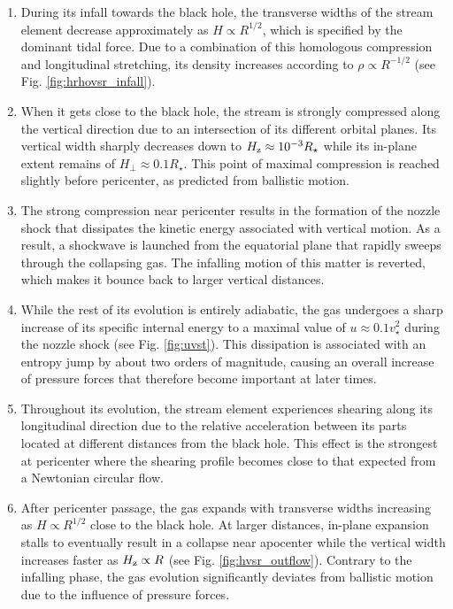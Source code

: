 \documentclass[a4paper,fleqn,usenatbib]{mnras}
\newcommand{\rstar}{R_{\star}}
\begin{document}
\begin{enumerate}

\item During its infall towards the black hole, the transverse widths of the stream element decrease approximately as $H \propto R^{1/2}$, which is specified by the dominant tidal force. Due to a combination of this homologous compression and longitudinal stretching, its density increases according to $\rho \propto R^{-1/2}$ (see Fig. \ref{fig:hrhovsr_infall}). 

\item When it gets close to the black hole, the stream is strongly compressed along the vertical direction due to an intersection of its different orbital planes. Its vertical width sharply decreases down to $H_{\rm z} \approx 10^{-3} \rstar$ while its in-plane extent remains of $H_{\perp} \approx 0.1 \rstar$. This point of maximal compression is reached slightly before pericenter, as predicted from ballistic motion. 

\item The strong compression near pericenter results in the formation of the nozzle shock that dissipates the kinetic energy associated with vertical motion. As a result, a shockwave is launched from the equatorial plane that rapidly sweeps through the collapsing gas. The infalling motion of this matter is reverted, which makes it bounce back to larger vertical distances.

\item While the rest of its evolution is entirely adiabatic, the gas undergoes a sharp increase of its specific internal energy to a maximal value of $u \approx 0.1 v^2_{\star}$ during the nozzle shock (see Fig. \ref{fig:uvst}). This dissipation is associated with an entropy jump by about two orders of magnitude, causing an overall increase of pressure forces that therefore become important at later times.

\item Throughout its evolution, the stream element experiences shearing along its longitudinal direction due to the relative acceleration between its parts located at different distances from the black hole. This effect is the strongest at pericenter where the shearing profile becomes close to that expected from a Newtonian circular flow.

\item After pericenter passage, the gas expands with transverse widths increasing as $H \propto R^{1/2}$ close to the black hole. At larger distances, in-plane expansion stalls to eventually result in a collapse near apocenter while the vertical width increases faster as $H_{\rm z} \propto R$ (see Fig. \ref{fig:hvsr_outflow}). Contrary to the infalling phase, the gas evolution significantly deviates from ballistic motion due to the influence of pressure forces.


\end{enumerate}
\end{document}
